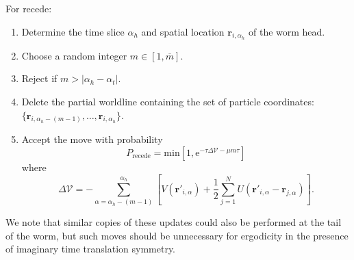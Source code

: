 \documentclass[prb,aps,amssym,nofootinbib,floatfix,notitlepage]{revtex4-1}
\renewcommand{\vec}[1]{\boldsymbol{#1}}
\newcommand{\e}[1]{\mathrm{e}^{#1}}
\begin{document}
\noindent
For recede:
\begin{enumerate}
    \item Determine the time slice $\alpha_h$ and spatial location
        $\vec{r}_{i,\alpha_h}$ of the worm head.
    \item Choose a random integer $m \in [1,\overline{m}]$.
    \item Reject if $m > |\alpha_h-\alpha_t|$.
    \item Delete the partial worldline containing the set of particle coordinates: 
        $\{\vec{r}_{i,\alpha_h-(m-1)},\ldots, \vec{r}_{i,\alpha_h}\}$.
\item Accept the move with probability
\begin{equation}
    P_{\text{recede}} = \mathrm{min} \left[1,
    \e{-\tau \Delta \mathcal{V} - \mu m \tau} \right]
\end{equation}
%
where
%
\begin{equation}
    \Delta\mathcal{V} = -\sum_{\alpha=\alpha_h-(m-1)}^{\alpha_h} \left[ 
        V(\vec{r}'_{i,\alpha}) + \frac{1}{2}\sum_{j=1}^N
        U(\vec{r}'_{i,\alpha}-\vec{r}_{j,\alpha}) \right].
\end{equation}
%
\end{enumerate}
We note that similar copies of these updates could also be performed at the
tail of the worm, but such moves should be unnecessary for ergodicity in the presence of
imaginary time translation symmetry.
\end{document}
